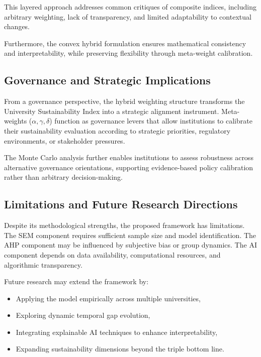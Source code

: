 \documentclass[11pt,a4paper]{article}
\begin{document}
This layered approach addresses common critiques of composite indices, 
including arbitrary weighting, lack of transparency, and limited 
adaptability to contextual changes.

Furthermore, the convex hybrid formulation ensures mathematical 
consistency and interpretability, while preserving flexibility through 
meta-weight calibration.

\subsection{Governance and Strategic Implications}

From a governance perspective, the hybrid weighting structure transforms 
the University Sustainability Index into a strategic alignment instrument. 
Meta-weights ($\alpha, \gamma, \delta$) function as governance levers 
that allow institutions to calibrate their sustainability evaluation 
according to strategic priorities, regulatory environments, or stakeholder 
pressures.

The Monte Carlo analysis further enables institutions to assess 
robustness across alternative governance orientations, supporting 
evidence-based policy calibration rather than arbitrary decision-making.

\subsection{Limitations and Future Research Directions}

Despite its methodological strengths, the proposed framework has 
limitations. The SEM component requires sufficient sample size and 
model identification. The AHP component may be influenced by subjective 
bias or group dynamics. The AI component depends on data availability, 
computational resources, and algorithmic transparency.

Future research may extend the framework by:

\begin{itemize}
\item Applying the model empirically across multiple universities,
\item Exploring dynamic temporal gap evolution,
\item Integrating explainable AI techniques to enhance interpretability,
\item Expanding sustainability dimensions beyond the triple bottom line.
\end{itemize}
\end{document}
